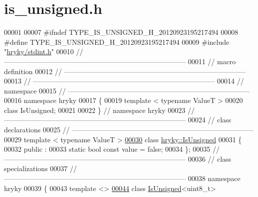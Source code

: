 \hypertarget{is__unsigned_8h_source}{\section{is\-\_\-unsigned.\-h}
}

\begin{DoxyCode}
00001 
00007 \textcolor{preprocessor}{#ifndef TYPE\_IS\_UNSIGNED\_H\_20120923195217494}
00008 \textcolor{preprocessor}{}\textcolor{preprocessor}{#define TYPE\_IS\_UNSIGNED\_H\_20120923195217494}
00009 \textcolor{preprocessor}{}\textcolor{preprocessor}{#include "\hyperlink{stdint_8h}{hryky/stdint.h}"}
00010 \textcolor{comment}{//
      ------------------------------------------------------------------------------}
00011 \textcolor{comment}{// macro definition}
00012 \textcolor{comment}{//
      ------------------------------------------------------------------------------}
00013 \textcolor{comment}{//
      ------------------------------------------------------------------------------}
00014 \textcolor{comment}{// namespace}
00015 \textcolor{comment}{//
      ------------------------------------------------------------------------------}
00016 \textcolor{keyword}{namespace }hryky
00017 \{
00019     \textcolor{keyword}{template} < \textcolor{keyword}{typename} ValueT >
00020     \textcolor{keyword}{class }IsUnsigned;
00021 
00022 \} \textcolor{comment}{// namespace hryky}
00023 \textcolor{comment}{//
      ------------------------------------------------------------------------------}
00024 \textcolor{comment}{// class declarations}
00025 \textcolor{comment}{//
      ------------------------------------------------------------------------------}
00029 \textcolor{comment}{}\textcolor{keyword}{template} < \textcolor{keyword}{typename} ValueT >
\hypertarget{is__unsigned_8h_source_l00030}{}\hyperlink{classhryky_1_1_is_unsigned}{00030} \textcolor{keyword}{class }\hyperlink{classhryky_1_1_is_unsigned}{hryky::IsUnsigned}
00031 \{
00032 \textcolor{keyword}{public} :
00033     \textcolor{keyword}{static} \textcolor{keywordtype}{bool} \textcolor{keyword}{const} value = \textcolor{keyword}{false};
00034 \};
00035 \textcolor{comment}{//
      ------------------------------------------------------------------------------}
00036 \textcolor{comment}{// class specializations}
00037 \textcolor{comment}{//
      ------------------------------------------------------------------------------}
00038 \textcolor{keyword}{namespace }hryky
00039 \{
00043 \textcolor{keyword}{template} <>
\hypertarget{is__unsigned_8h_source_l00044}{}\hyperlink{classhryky_1_1_is_unsigned_3_01uint8__t_01_4}{00044} \textcolor{keyword}{class }\hyperlink{classhryky_1_1_is_unsigned}{IsUnsigned}<uint8\_t>

\end{DoxyCode}
